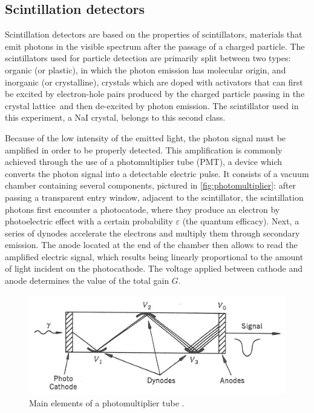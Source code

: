 \subsection{Scintillation detectors}
\label{sec:scinitillators}

Scintillation detectors are based on the properties of scintillators, materials that emit photons in the visible spectrum after the passage of a charged particle.
The scintillators used for particle detection are primarily split between two types: organic (or plastic), in which the photon emission has molecular origin, 
and inorganic (or crystalline), crystals which are doped with activators that can first be excited by electron-hole pairs 
produced by the charged particle passing in the crystal lattice\footnotemark\ and then de-excited by photon emission\cite{intro_nuclear_particle_physics}.
The scintillator used in this experiment, a NaI crystal, belongs to this second class.

Because of the low intensity of the emitted light, the photon signal must be amplified in order to be properly detected.
This amplification is commonly achieved through the use of a photomultiplier tube (PMT), a device which converts the photon signal into a detectable electric pulse.
It consists of a vacuum chamber containing several components, pictured in \autoref{fig:photomultiplier}: 
after passing a transparent entry window, adjacent to the scintillator, 
the scintillation photons first encounter a photocatode, 
where they produce an electron by photoelectric effect with a certain 
probability $\varepsilon$ (the quantum efficacy).
Next, a series of dynodes accelerate the electrons and multiply 
them through secondary emission.
The anode located at the end of the chamber then allows to read 
the amplified electric signal, 
which results being linearly proportional to the amount of 
light incident on the photocathode.
The voltage applied between cathode and anode determines 
the value of the total gain $G$.
%
\begin{figure}[htbp]
    \centering
    \includegraphics[scale=1.2]{figures/photomultiplier.jpg}
    \caption{Main elements of a photomultiplier tube \cite{intro_nuclear_particle_physics}.}
    \label{fig:photomultiplier}
\end{figure}

